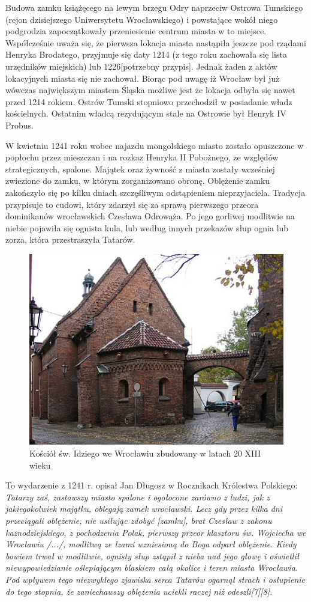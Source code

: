 \documentclass{article}
\begin{document}
Budowa zamku książęcego na lewym brzegu Odry naprzeciw Ostrowa Tumskiego (rejon dzisiejszego Uniwersytetu Wrocławskiego) i powstające wokół niego podgrodzia zapoczątkowały przeniesienie centrum miasta w to miejsce. Współcześnie uważa się, że pierwsza lokacja miasta nastąpiła jeszcze pod rządami Henryka Brodatego, przyjmuje się daty 1214 (z tego roku zachowała się lista urzędników miejskich) lub 1226[potrzebny przypis]. Jednak żaden z aktów lokacyjnych miasta się nie zachował. Biorąc pod uwagę iż Wrocław był już wówczas największym miastem Śląska możliwe jest że lokacja odbyła się nawet przed 1214 rokiem. Ostrów Tumski stopniowo przechodził w posiadanie władz kościelnych. Ostatnim władcą rezydującym stale na Ostrowie był Henryk IV Probus.


W kwietniu 1241 roku wobec najazdu mongolskiego miasto zostało opuszczone w popłochu przez mieszczan i na rozkaz Henryka II Pobożnego, ze względów strategicznych, spalone. Majątek oraz żywność z miasta zostały wcześniej zwiezione do zamku, w którym zorganizowano obronę. Oblężenie zamku zakończyło się po kilku dniach szczęśliwym odstąpieniem nieprzyjaciela. Tradycja przypisuje to cudowi, który zdarzył się za sprawą pierwszego przeora dominikanów wrocławskich Czesława Odrowąża. Po jego gorliwej modlitwie na niebie pojawiła się ognista kula, lub według innych przekazów słup ognia lub zorza, która przestraszyła Tatarów.
 \begin{figure}[h!]
\centering
\includegraphics[scale=0.4]{2.jpg}
\caption{Kościół św. Idziego we Wrocławiu zbudowany w latach 20 XIII wieku}
\end{figure}

To wydarzenie z 1241 r. opisał Jan Długosz w Rocznikach Królestwa Polskiego:
\textit{Tatarzy zaś, zastawszy miasto spalone i ogołocone zarówno z ludzi, jak z jakiegokolwiek majątku, oblegają zamek wrocławski. Lecz gdy przez kilka dni przeciągali oblężenie, nie usiłując zdobyć [zamku], brat Czesław z zakonu kaznodziejskiego, z pochodzenia Polak, pierwszy przeor klasztoru św. Wojciecha we Wrocławiu /.../, modlitwą ze łzami wzniesioną do Boga odparł oblężenie. Kiedy bowiem trwał w modlitwie, ognisty słup zstąpił z nieba nad jego głowę i oświetlił niewypowiedzianie oślepiającym blaskiem całą okolice i teren miasta Wrocławia. Pod wpływem tego niezwykłego zjawiska serca Tatarów ogarnął strach i osłupienie do tego stopnia, że zaniechawszy oblężenia uciekli raczej niż odeszli[7][8].}
\end{document}
